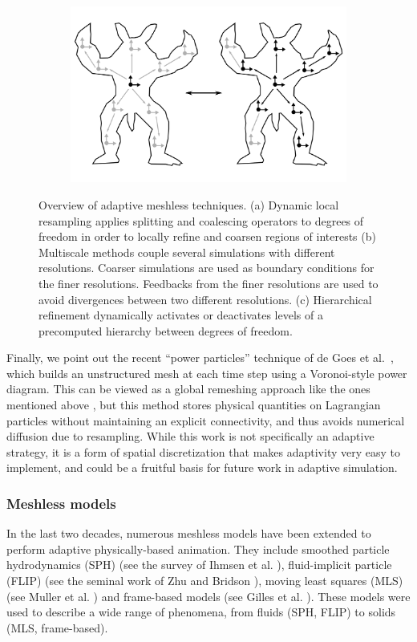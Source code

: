 \begin{figure}[t]
\begin{subfigure}[b]{0.3\linewidth}
\includegraphics[width=\linewidth]{images/starAdaptivity-cgf2016/particles-hierarchy.png}
\caption{\label{fig:meshless-hierarchy}}
\end{subfigure}
\caption{\label{fig:particleOverview}
Overview of adaptive meshless techniques.
(a) Dynamic local resampling applies splitting and coalescing operators to degrees of freedom in order to locally refine and coarsen regions of interests (b) Multiscale methods couple several simulations with different resolutions. Coarser simulations are used as boundary conditions for the finer resolutions. Feedbacks from the finer resolutions are used to avoid divergences between two different resolutions. (c) Hierarchical refinement dynamically activates or deactivates levels of a precomputed hierarchy between degrees of freedom.}
\end{figure}


Finally, we point out the recent ``power particles'' technique of de Goes et al.~\cite{deGoes2015}, which builds an unstructured mesh at each time step using a Voronoi-style power diagram.
This can be viewed as a global remeshing approach like the ones mentioned above \cite{Klingner2006,Bargteil2007}, but this method stores physical quantities on Lagrangian particles without maintaining an explicit connectivity, and thus avoids numerical diffusion due to resampling.
While this work is not specifically an adaptive strategy, it is a form of spatial discretization that makes adaptivity very easy to implement, and could be a fruitful basis for future work in adaptive simulation.

\subsubsection{Meshless models}
\label{sec:meshless}
In the last two decades, numerous meshless models have been extended to perform adaptive physically-based animation. They include smoothed particle hydrodynamics (SPH) (see the survey of Ihmsen et al. \cite{Ihmsen2014}), fluid-implicit particle (FLIP) (see the seminal work of Zhu and Bridson \cite{Zhu2005}), moving least squares (MLS) (see Muller et al. \cite{Muller2004}) and frame-based models (see Gilles et al. \cite{Gilles2011}). These models were used to describe a wide range of phenomena, from fluids (SPH, FLIP) to solids (MLS, frame-based).

